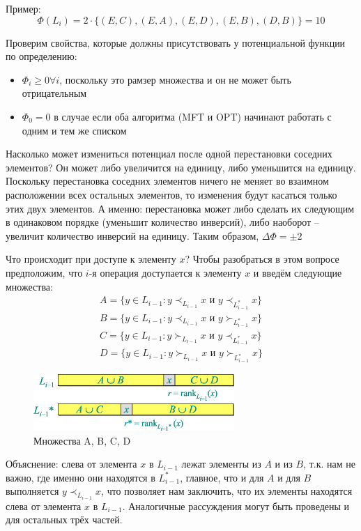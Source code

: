\documentclass[a4paper,11pt]{article}
\begin{document}
Пример:
$$
\Phi(L_i) = 2 \cdot \{ (E,C), (E,A), (E,D), (E,B), (D,B)\} = 10
$$

Проверим свойства, которые должны присутствовать у потенциальной функции по
определению:

\begin{itemize}
\item $\Phi_i \geqslant 0 \forall i$, поскольку это рамзер множества и он не
  может быть отрицательным
\item $\Phi_0 = 0$ в случае если оба алгоритма (MFT и OPT) начинают работать с
  одним и тем же списком
\end{itemize}

Насколько может измениться потенциал после одной перестановки соседних
элементов? Он может либо увеличится на единицу, либо уменьшится на единицу.
Поскольку перестановка соседних элементов ничего не меняет во взаимном
расположении всех остальных элементов, то изменения будут касаться только этих
двух элементов. А именно: перестановка может либо сделать их следующим в
одинаковом порядке (уменьшит количество инверсий), либо наоборот -- увеличит
количество инверсий на единицу. Таким образом, $\Delta\Phi = \pm 2$

Что происходит при доступе к элементу $x$? Чтобы разобраться в этом вопросе
предположим, что $i$-я операция доступается к элементу $x$ и введём следующие
множества:
\begin{gather*}
A = \{ y \in L_{i-1} : y \prec_{L_{i-1}} x \text{ и } y \prec_{L_{i-1}^*} x \}
\\
B = \{ y \in L_{i-1} : y \prec_{L_{i-1}} x \text{ и } y \succ_{L_{i-1}^*} x \}
\\
C = \{ y \in L_{i-1} : y \succ_{L_{i-1}} x \text{ и } y \prec_{L_{i-1}^*} x \}
\\
D = \{ y \in L_{i-1} : y \succ_{L_{i-1}} x \text{ и } y \succ_{L_{i-1}^*} x \}
\end{gather*}

\begin{figure}[ht]
  \centering
  \includegraphics[width=3in]{lecture14/sets.eps}
  \caption{Множества A, B, C, D}
  \label{fig:sets}
\end{figure}

Объяснение: слева от элемента $x$ в $L_{i-1}$ лежат элементы из $A$ и из $B$,
т.к. нам не важно, где именно они находятся в $L_{i-1}^*$, главное, что и для
$A$ и для $B$ выполняется $y \prec_{L_{i-1}} x$, что позволяет нам заключить,
что их элементы находятся слева от элемента $x$ в $L_{i-1}$. Аналогичные
рассуждения могут быть проведены и для остальных трёх частей.
\end{document}
